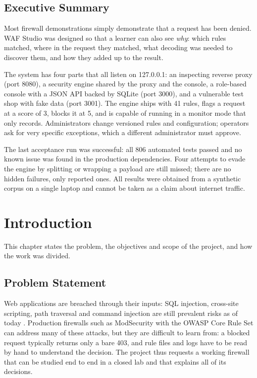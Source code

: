 \documentclass{FastFyp}
\begin{document}
\section*{Executive Summary}
Most firewall demonstrations simply demonstrate that a request has been denied. WAF Studio was designed so that a learner can also see \emph{why}: which rules matched, where in the request they matched, what decoding was needed to discover them, and how they added up to the result.

The system has four parts that all listen on 127.0.0.1: an inspecting reverse proxy (port 8080), a security engine shared by the proxy and the console, a role-based console with a JSON API backed by SQLite (port 3000), and a vulnerable test shop with fake data (port 3001). The engine ships with 41 rules, flags a request at a score of 3, blocks it at 5, and is capable of running in a monitor mode that only records. Administrators change versioned rules and configuration; operators ask for very specific exceptions, which a different administrator must approve.

The last acceptance run was successful: all 806 automated tests passed and no known issue was found in the production dependencies. Four attempts to evade the engine by splitting or wrapping a payload are still missed; there are no hidden failures, only reported ones. All results were obtained from a synthetic corpus on a single laptop and cannot be taken as a claim about internet traffic.

\pagestyle{fancy}
\pagebreak
\tableofcontents

\mainmatter

\chapter{Introduction}
This chapter states the problem, the objectives and scope of the project, and how the work was divided.

\section{Problem Statement}
Web applications are breached through their inputs: SQL injection, cross-site scripting, path traversal and command injection are still prevalent risks as of today \cite{ref:owasptop10}. Production firewalls such as ModSecurity with the OWASP Core Rule Set \cite{ref:modsecurity,ref:crs} can address many of these attacks, but they are difficult to learn from: a blocked request typically returns only a bare 403, and rule files and logs have to be read by hand to understand the decision. The project thus requests a working firewall that can be studied end to end in a closed lab and that explains all of its decisions.
\end{document}
